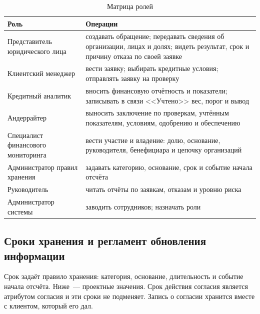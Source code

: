 \begin{table}[h]
\centering
\caption{Матрица ролей}
\begin{tabular}{|p{}|p{}|}
\hline
\textbf{Роль} & \textbf{Операции} \\
\hline
\raggedright Представитель юридического лица & создавать обращение; передавать сведения об организации, лицах и долях; видеть результат, срок и причину отказа по своей заявке \\
\hline
Клиентский менеджер & вести заявку; выбирать кредитные условия; отправлять заявку на проверку \\
\hline
Кредитный аналитик & вносить финансовую отчётность и показатели; записывать в связи <<Учтено>> вес, порог и вывод \\
\hline
Андеррайтер & выносить заключение по проверкам, учтённым показателям, условиям, одобрению и обеспечению \\
\hline
\raggedright Специалист финансового мониторинга & вести участие и владение: долю, основание, руководителя, бенефициара и цепочку организаций \\
\hline
\raggedright Администратор правил хранения & задавать категорию, основание, срок и событие начала отсчёта \\
\hline
Руководитель & читать отчёты по заявкам, отказам и уровню риска \\
\hline
Администратор системы & заводить сотрудников; назначать роли \\
\hline
\end{tabular}
\end{table}

\subsection{Сроки хранения и регламент обновления информации}

Срок задаёт правило хранения: категория, основание, длительность и событие начала отсчёта. Ниже~--- проектные значения. Срок действия согласия является атрибутом согласия и эти сроки не подменяет. Запись о согласии хранится вместе с клиентом, который его дал.

